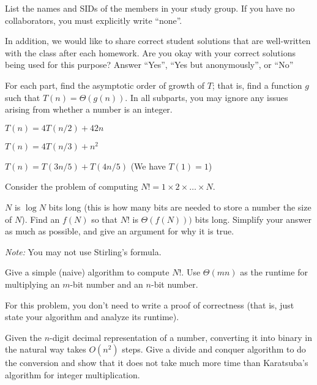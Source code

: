 \documentclass{article}
\begin{document}
List the names and SIDs of the members in your study group.
If you have no collaborators, you must explicitly write “none”.

In addition, we would like to share correct student solutions that are well-written with the class after each homework. 
Are you okay with your correct solutions being used for this purpose? Answer ``Yes'', ``Yes but anonymously'', or ``No''



For each part, find the asymptotic order of growth of $T$; that is, find a function $g$ such that $T(n) = \Theta(g(n))$. In all subparts, you may ignore any issues arising from whether a number is an integer.

\begin{subparts}
\subpart \(T(n)=4T(n/2)+42n\)

\subpart \(T(n)=4T(n/3)+n^2\)

\subpart \(T(n) = T(3n/5)+T(4n/5)\) (We have $T(1) = 1$)
\end{subparts}


Consider the problem of computing $N!=1\times2\times\dots\times N$.
\begin{subparts}

\subpart $N$ is $\log N$ bits long (this is how many bits are needed to store a number the size of $N$).
Find an $f(N)$ so that $N!$ is $\Theta(f(N)))$ bits long.
Simplify your answer as much as possible, and give an argument for why it is true.

\textit{Note:} You may not use Stirling's formula.

\vspace{0.3cm}

\subpart Give a simple (naive) algorithm to compute $N!$.
Use $\Theta(mn)$ as the runtime for multiplying an $m$-bit number and an $n$-bit number.

For this problem, you don't need to write a proof of correctness (that is, just state your algorithm and analyze its runtime).

\end{subparts}



Given the $n$-digit decimal representation of a number, converting it into binary in the natural way takes $O(n^2)$ steps. 
Give a divide and conquer algorithm to do the conversion and show that it does not take much more time than Karatsuba's 
algorithm for integer multiplication. 
\end{document}

